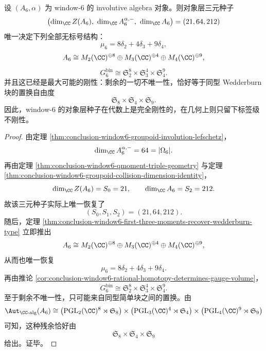 \begin{theorem}\label{thm:conclusion-window6-object-seed-fixes-unlabelled-semisimple-type-up-to-block-permutation}
设 \((A_6,\alpha)\) 为 window-\(6\) 的 involutive algebra 对象。则对象层三元种子
\[
\bigl(\dim_{\CC}Z(A_6),\ \dim_{\CC}A_6^{\alpha,-},\ \dim_{\CC}A_6\bigr)
=(21,64,212)
\]
唯一决定下列全部无标号结构：
\[
\mu_6=8\delta_2+4\delta_3+9\delta_4,
\]
\[
A_6\cong M_2(\CC)^{\oplus 8}\oplus M_3(\CC)^{\oplus 4}\oplus M_4(\CC)^{\oplus 9},
\]
\[
G_6^{\mathrm{bin}}\cong \mathfrak S_2^{8}\times \mathfrak S_3^{4}\times \mathfrak S_4^{9}.
\]
并且这已经是最大可能的刚性：剩余的一切不唯一性，恰好等于同型 Wedderburn 块的置换自由度
\[
\mathfrak S_8\times \mathfrak S_4\times \mathfrak S_9.
\]
因此，window-\(6\) 的对象层种子在代数上是完全刚性的，在几何上则只留下标签级不刚性。
\end{theorem}

\begin{proof}
由定理 \ref{thm:conclusion-window6-groupoid-involution-lefschetz}，
\[
\dim_{\CC}A_6^{\alpha,-}=64=|\Omega_6|.
\]
再由定理 \ref{thm:conclusion-window6-qmoment-triple-geometry} 与定理 \ref{thm:conclusion-window6-groupoid-collision-dimension-identity}，
\[
\dim_{\CC}Z(A_6)=S_0=21,
\qquad
\dim_{\CC}A_6=S_2=212.
\]
故该三元种子实际上唯一恢复了
\[
(S_0,S_1,S_2)=(21,64,212).
\]
随后，定理 \ref{thm:conclusion-window6-first-three-moments-recover-wedderburn-type} 立即推出
\[
A_6\cong M_2(\CC)^{\oplus 8}\oplus M_3(\CC)^{\oplus 4}\oplus M_4(\CC)^{\oplus 9},
\]
从而也唯一恢复
\[
\mu_6=8\delta_2+4\delta_3+9\delta_4.
\]
再由推论 \ref{cor:conclusion-window6-rational-homotopy-determines-gauge-volume}，
\[
G_6^{\mathrm{bin}}\cong \mathfrak S_2^{8}\times \mathfrak S_3^{4}\times \mathfrak S_4^{9}.
\]
至于剩余不唯一性，只可能来自同型简单块之间的置换。由
\[
\Aut_{\CC\text{-alg}}(A_6)
\cong
\bigl(\operatorname{PGL}_2(\CC)^8\rtimes \mathfrak S_8\bigr)
\times
\bigl(\operatorname{PGL}_3(\CC)^4\rtimes \mathfrak S_4\bigr)
\times
\bigl(\operatorname{PGL}_4(\CC)^9\rtimes \mathfrak S_9\bigr)
\]
可知，这种残余恰好由
\[
\mathfrak S_8\times \mathfrak S_4\times \mathfrak S_9
\]
给出。证毕。
\end{proof}


